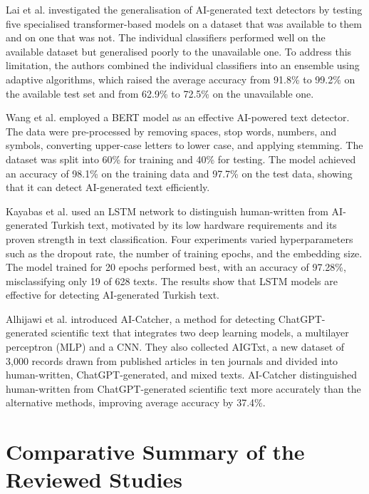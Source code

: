 Lai et al. \cite{lai2024} investigated the generalisation of AI-generated text detectors by testing five specialised transformer-based models on a dataset that was available to them and on one that was not. The individual classifiers performed well on the available dataset but generalised poorly to the unavailable one. To address this limitation, the authors combined the individual classifiers into an ensemble using adaptive algorithms, which raised the average accuracy from 91.8\% to 99.2\% on the available test set and from 62.9\% to 72.5\% on the unavailable one.

Wang et al. \cite{wang2024} employed a BERT model as an effective AI-powered text detector. The data were pre-processed by removing spaces, stop words, numbers, and symbols, converting upper-case letters to lower case, and applying stemming. The dataset was split into 60\% for training and 40\% for testing. The model achieved an accuracy of 98.1\% on the training data and 97.7\% on the test data, showing that it can detect AI-generated text efficiently.

Kayabas et al. \cite{kayabas2025} used an LSTM network to distinguish human-written from AI-generated Turkish text, motivated by its low hardware requirements and its proven strength in text classification. Four experiments varied hyperparameters such as the dropout rate, the number of training epochs, and the embedding size. The model trained for 20 epochs performed best, with an accuracy of 97.28\%, misclassifying only 19 of 628 texts. The results show that LSTM models are effective for detecting AI-generated Turkish text.

Alhijawi et al. \cite{alhijawi2025} introduced AI-Catcher, a method for detecting ChatGPT-generated scientific text that integrates two deep learning models, a multilayer perceptron (MLP) and a CNN. They also collected AIGTxt, a new dataset of 3{,}000 records drawn from published articles in ten journals and divided into human-written, ChatGPT-generated, and mixed texts. AI-Catcher distinguished human-written from ChatGPT-generated scientific text more accurately than the alternative methods, improving average accuracy by 37.4\%.

\section{Comparative Summary of the Reviewed Studies}
\label{sec:lr_comparison}

